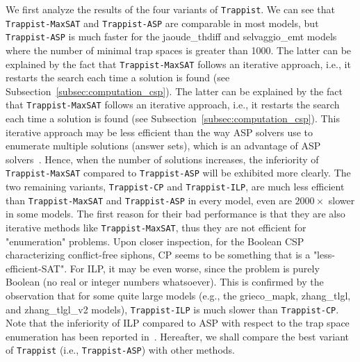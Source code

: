 \documentclass[preprint,12pt]{elsarticle}
\begin{document}
We first analyze the results of the four variants of \texttt{Trappist}.
We can see that \texttt{Trappist-MaxSAT} and \texttt{Trappist-ASP} are comparable in most models, but \texttt{Trappist-ASP} is much faster for the jaoude\_thdiff and selvaggio\_emt models where the number of minimal trap spaces is greater than 1000.
The latter can be explained by the fact that \texttt{Trappist-MaxSAT} follows an iterative approach, i.e., it restarts the search each time a solution is found (see Subsection~\ref{subsec:computation_csp}).
The latter can be explained by the fact that \texttt{Trappist-MaxSAT} follows an iterative approach, i.e., it restarts the search each time a solution is found (see Subsection~\ref{subsec:computation_csp}).
This iterative approach may be less efficient than the way ASP solvers use to enumerate multiple solutions (answer sets), which is an advantage of ASP solvers~\cite{DBLP:journals/aicom/GebserKKOSS11}.
Hence, when the number of solutions increases, the inferiority of \texttt{Trappist-MaxSAT} compared to \texttt{Trappist-ASP} will be exhibited more clearly.
The two remaining variants, \texttt{Trappist-CP} and \texttt{Trappist-ILP}, are much less efficient than \texttt{Trappist-MaxSAT} and \texttt{Trappist-ASP} in every model, even are \(2000 \times\) slower in some models.
The first reason for their bad performance is that they are also iterative methods like \texttt{Trappist-MaxSAT}, thus they are not efficient for "enumeration" problems.
Upon closer inspection, for the Boolean CSP characterizing conflict-free siphons, CP seems to be something that is a "less-efficient-SAT".
For ILP, it may be even worse, since the problem is purely Boolean (no
real or integer numbers whatsoever).
This is confirmed by the observation that for some quite large models (e.g., the grieco\_mapk, zhang\_tlgl, and zhang\_tlgl\_v2 models), \texttt{Trappist-ILP} is much slower than \texttt{Trappist-CP}.
Note that the inferiority of ILP compared to ASP with respect to the trap space enumeration has been reported in~\cite{klarner2015computing}.
Hereafter, we shall compare the best variant of \texttt{Trappist} (i.e., \texttt{Trappist-ASP}) with other methods.
 
\end{document}
